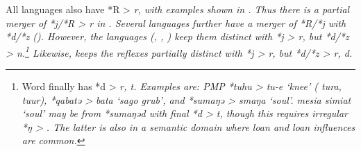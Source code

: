 All  languages also have *R > \it{r},
with examples shown in .
Thus there is a partial merger of *j/*R > \it{r} in .
Several languages further have a merger of *R/*j with *d/*z ().
However, the  languages (,
, ) keep them distinct with *j > \it{r},
but *d/*z > \it{n}.\footnote{
		Word finally  has *d > \it{r}, \it{t}.
		Examples are: PMP *tuhu >  \it{tu-e}
		‘knee’ ( \it{tura},  \it{tuur}),
		*qabatə > \it{bata} ‘sago grub’,
		and *sumaŋə > \it{smaŋa} ‘soul’.
		 \it{mesia simiat} ‘soul’ may be from *sumaŋəd with final
		*d > \it{t}, though this requires irregular *ŋ > {\0}.
		The latter is also in a semantic domain where loan
		and loan influences are common.}
Likewise,  keeps the reflexes partially distinct with *j > \it{r},
but *d/*z > \it{r, d}.

